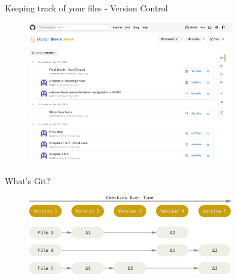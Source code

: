 \documentclass[10pt,times]{beamer}
\begin{document}
\begin{frame}{Keeping track of your files - Version Control}
\begin{figure}
  \centering
  \includegraphics[width=0.8\textwidth]{figs/thesis-git.png}
\end{figure}
\end{frame}

\begin{frame}{What's Git?}
\begin{figure}
  \centering
  \includegraphics[width=0.8\textwidth]{figs/git.png}
\end{figure}
\end{frame}
\end{document}
